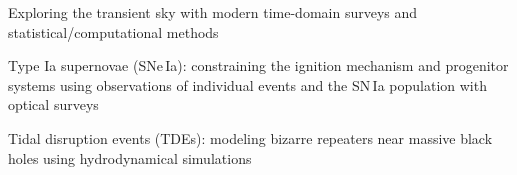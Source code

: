 


\begin{cvpubs}


\cvpub
{ %
\begin{cvitems}
\item Exploring the transient sky with modern time-domain surveys and statistical/computational methods
\item Type Ia supernovae (SNe\,Ia): constraining the ignition mechanism and progenitor systems using observations of individual events and the SN\,Ia population with optical surveys
\item Tidal disruption events (TDEs): modeling bizarre repeaters near massive black holes using hydrodynamical simulations
\end{cvitems}
}


\end{cvpubs}